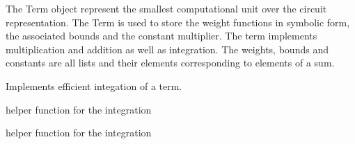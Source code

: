 \documentclass[letterpaper,10pt,english]{sphinxmanual}
\begin{document}
\begin{fulllineitems}
\label{\detokenize{index:term.Term}}
The Term object represent the smallest computational unit over the circuit representation. The Term is used to store the weight
functions in symbolic form, the associated bounds and the constant multiplier. The term implements multiplication and addition as well
as integration. The weights, bounds and constants are all lists and their elements corresponding to elements of a sum.

\begin{fulllineitems}
\label{\detokenize{index:term.Term.integrate}}
Implements efficient integation of a term.

\end{fulllineitems}


\end{fulllineitems}


\begin{fulllineitems}
\label{\detokenize{index:term.integrateFromDict}}
helper function for the integration

\end{fulllineitems}


\begin{fulllineitems}
\label{\detokenize{index:term.symbolicToNumeric}}
helper function for the integration

\end{fulllineitems}
\end{document}
